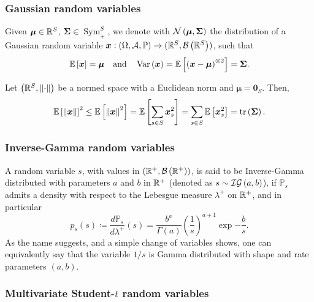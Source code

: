 \subsubsection{Gaussian random variables}

Given $\bm{\mu} \in \mathbb{R}^S$, $\bm{\Sigma} \in \operatorname{Sym}_+^{S}$, we denote with $\mathcal{N}\left(\bm{\mu}, \bm{\Sigma}\right)$ the distribution of a Gaussian random variable $\bm{x}: (\Omega, \mathcal{A}, \mathbb{P}) \to (\mathbb{R}^S, \mathcal{B}\left(\mathbb{R}^S\right))$, such that
\begin{equation*}
	\mathbb{E}_{\kern-0.5pt}\left[\bm{x}\right] = \bm{\mu} \quad \text{and} \quad \operatorname{Var}\left(\bm{x}\right) = \mathbb{E}_{\kern-0.5pt}\left[\left(\bm{x} - \bm{\mu}\right)^{\otimes 2}\right] = \bm{\Sigma}.
\end{equation*}
\begin{remark} \label{rem:gaussmoments} 
	Let $\left(\mathbb{R}^S, \left\lVert\cdot\right\rVert\right)$ be a normed space with a Euclidean norm and $\bm{\mu} = \bm{0}_S$. Then,
	\begin{equation*}
	\mathbb{E}_{\kern-0.5pt}\left[\left\lVert\bm{x}\right\rVert\right]^2 \leq \mathbb{E}_{\kern-0.5pt}\left[\left\lVert\bm{x}\right\rVert^2\right] = \mathbb{E}_{\kern-0.5pt}\left[\sum_{s \in S} \bm{x}_s^2\right] = \sum_{s \in S} \mathbb{E}_{\kern-0.5pt}\left[\bm{x}_s^2\right] = \operatorname{tr}\left(\bm{\Sigma}\right).
	\end{equation*}
\end{remark}

\subsubsection{Inverse-Gamma random variables}

A random variable $s$, with values in $\left(\mathbb{R}^+, \mathcal{B}\left(\mathbb{R}^+\right)\right)$, is said to be Inverse-Gamma distributed with parameters $a$ and $b$ in $\mathbb{R}^+$ (denoted as $s \sim \mathcal{IG}\left(a, b\right)$), if $\mathbb{P}_{s}$ admits a density with respect to the Lebesgue measure $\lambda^+$ on $\mathbb{R}^+$, and in particular
\begin{equation*}
	p_s(s) \coloneqq \frac{d\mathbb{P}_{s}}{d\lambda^+}(s) = \frac{b^a}{\Gamma(a)} \left(\frac{1}{s}\right)^{a + 1} \exp{-\frac{b}{s}}.
\end{equation*}
As the name suggests, and a simple change of variables shows, one can equivalently say that the variable $1 / s$ is Gamma distributed with shape and rate parameters $(a, b)$.

\subsubsection{Multivariate \texorpdfstring{Student-$t$}{Student-t} random variables}

